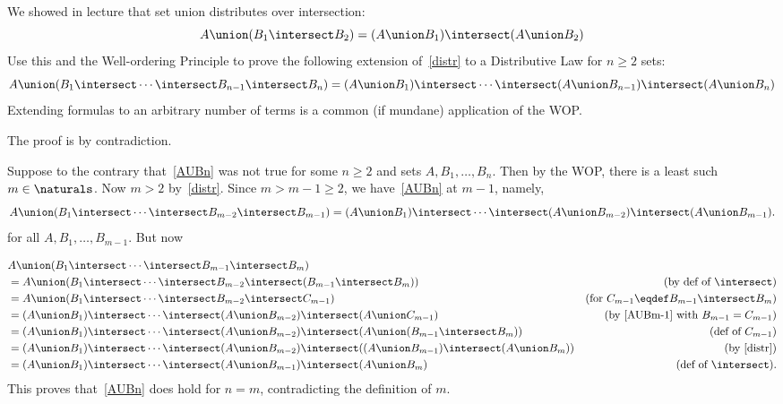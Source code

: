 \begin{problem}
We showed in lecture that set union distributes over intersection:
%
\begin{equation}\label{distr}
A \union (B_1 \intersect B_2) = (A \union B_1) \intersect (A \union B_2)
\end{equation}
%
Use this and the Well-ordering Principle to prove the following
extension of~\eqref{distr} to a Distributive Law for $n \geq 2$ sets:
%
\begin{equation}\label{AUBn}
  A \union (B_1 \intersect \cdots  \intersect B_{n-1} \intersect B_n)
  = (A \union B_1)  \intersect \cdots \intersect (A \union B_{n-1} ) \intersect (A \union B_n)
\end{equation}
%
Extending formulas to an arbitrary number of terms is a common (if
mundane) application of the WOP.

\begin{solution}

The proof is by contradiction.

Suppose to the contrary that~\eqref{AUBn} was not true for some $n \geq 2$ and
sets $A,B_1,\dots,B_n$.   Then by the WOP, there is a least such $m \in
\naturals$.  Now $m > 2$ by~\eqref{distr}.  Since $m> m-1 \geq 2$, we
have~\eqref{AUBn} at $m-1$, namely,
\begin{equation}\label{AUBm-1}
A \union (B_1 \intersect \cdots  \intersect B_{m-2} \intersect B_{m-1})
    = (A \union B_1) \intersect \cdots \intersect  (A \union B_{m-2})
    \intersect (A \union B_{m-1}).
\end{equation}
for all $A,B_1,\dots,B_{m-1}$.  But now

\begin{align*}
\lefteqn{A \union (B_1 \intersect \cdots \intersect B_{m-1} \intersect B_m)}\\
    & = A \union (B_1 \intersect \cdots \intersect B_{m-2} \intersect (B_{m-1} \intersect B_m)) & \text{(by def of $\intersect$)}\\
    & = A \union (B_1 \intersect \cdots
\intersect B_{m-2}\intersect C_{m-1}) & (\text{for } C_{m-1} \eqdef B_{m-1} \intersect B_m)\\
    & = (A \union B_1) \intersect \cdots
    \intersect (A \union B_{m-2}) \intersect (A \union C_{m-1}) &
    \text{(by~\eqref{AUBm-1} with $B_{m-1} = C_{m-1}$)}\\
    & = (A \union B_1) \intersect \cdots \intersect (A \union B_{m-2})
    \intersect (A \union (B_{m-1} \intersect B_m)) & \text{(def of $C_{m-1}$)}\\
    & = (A \union B_1) \intersect \cdots \intersect (A \union B_{m-2})
    \intersect ((A \union B_{m-1}) \intersect (A \union B_m)) & \text{(by~\eqref{distr})}\\
    & = (A \union B_1)  \intersect \cdots \intersect (A \union B_{m-1})
    \intersect (A \union B_m) & \text{(def of $\intersect$)}.
\end{align*}
This proves that~\eqref{AUBn} does hold for $n = m$, contradicting the
definition of $m$.


\end{solution}
\end{problem}
